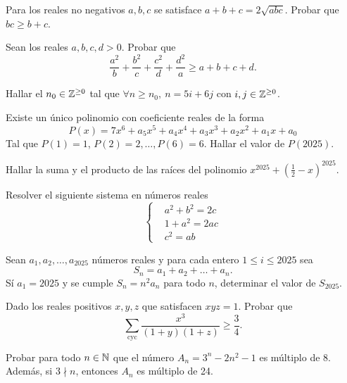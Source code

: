 \begin{exercise}
    Para los reales no negativos $a,b,c$ se satisface $a + b + c = 2 \sqrt {abc}$.
    Probar que $bc \geq b + c$.
\end{exercise}

\begin{exercise}
    Sean los reales $a,b,c,d > 0$.
    Probar que
    \[
        \frac{a^2}{b} + \frac{b^2}{c} + \frac{c^2}{d} + \frac{d^2}{a} \geq a + b + c + d.
    \]
\end{exercise}

\begin{exercise}
    Hallar el $n_0 \in \mathbb{Z}^{\geq 0}$ tal que $\forall n \geq n_0,\ n = 5i + 6j$ con $i,j \in \mathbb{Z}^{\geq 0}$.
\end{exercise}

\begin{exercise}
    Existe un único polinomio con coeficiente reales de la forma
    \[
        P(x) = 7 x^6 + a_5 x^5 + a_4 x^4 + a_3 x^3 + a_2 x^2 + a_1 x + a_0
    \]
    Tal que $P(1) = 1$, $P(2) = 2, \ldots, P(6) = 6$.
    Hallar el valor de $P(2025)$.
\end{exercise}

\begin{exercise}
    Hallar la suma y el producto de las raíces del polinomio $x^{2025} + \left(\frac{1}{2} - x\right)^{2025}$.
\end{exercise}

\begin{exercise}
    Resolver el siguiente sistema en números reales
    \[
        \begin{cases}
            & a^2 + b^2 = 2c\\
            & 1 + a^2 = 2ac\\
            & c^2 = ab
        \end{cases}
    \]
\end{exercise}

\begin{exercise}
    Sean $a_1, a_2, \ldots, a_{2025}$ números reales y para cada entero $1  \leq i \leq 2025$ sea
    \[
        S_n = a_1 + a_2 + \ldots + a_{n}.
    \]
    Sí $a_1 = 2025$ y se cumple $S_n = n^2 a_n$ para todo $n$, determinar el valor de $S_{2025}$.
\end{exercise}

\begin{exercise}
    Dado los reales positivos $x,y,z$ que satisfacen $xyz = 1$.
    Probar que
    \[
        \sum_{\text{cyc}} \frac{x^3}{(1 + y)(1 + z)} \geq \frac{3}{4}.
    \]
\end{exercise}

\begin{exercise}
    Probar para todo $n \in \mathbb{N}$ que el número $A_n = 3^n - 2n^2 - 1$ es múltiplo de $8$.
    Además, si $3\nmid n$, entonces $A_n$ es múltiplo de 24.
\end{exercise}